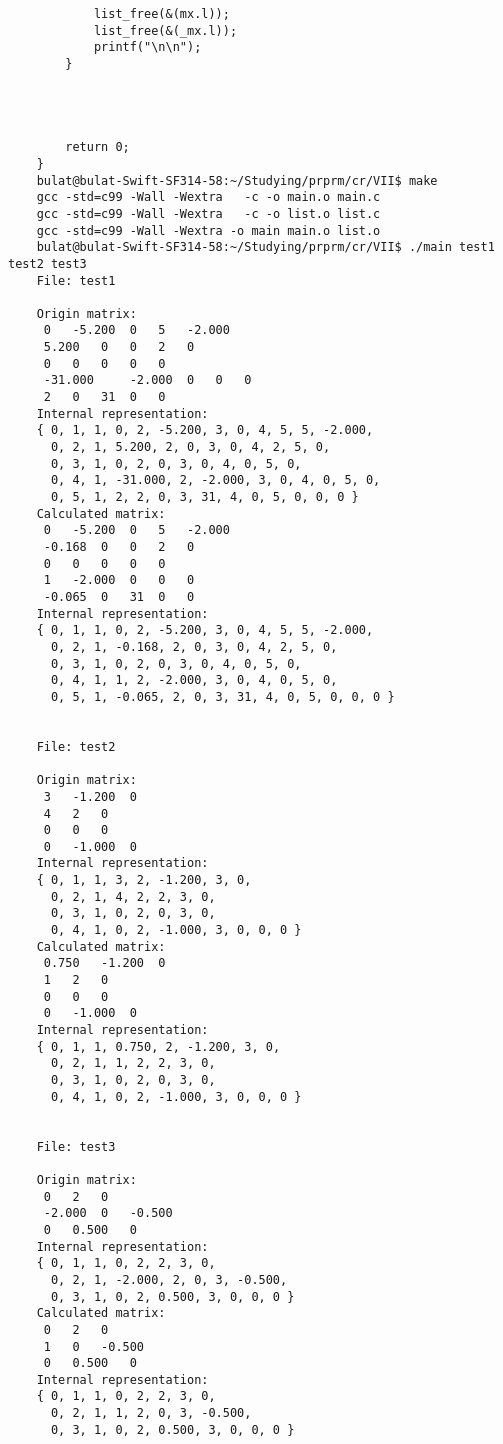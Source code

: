 \documentclass[a4paper]{article}
\newcounter{i}
\begin{document}
\begin{enumerate}[label=\textbf{\arabic*}.]
\begin{verbatim}
            list_free(&(mx.l));
            list_free(&(_mx.l));
            printf("\n\n");
        }
    
        
    
    
        return 0;
    }
    bulat@bulat-Swift-SF314-58:~/Studying/prprm/cr/VII$ make
    gcc -std=c99 -Wall -Wextra   -c -o main.o main.c
    gcc -std=c99 -Wall -Wextra   -c -o list.o list.c
    gcc -std=c99 -Wall -Wextra -o main main.o list.o
    bulat@bulat-Swift-SF314-58:~/Studying/prprm/cr/VII$ ./main test1 test2 test3
    File: test1
    
    Origin matrix:
     0   -5.200  0   5   -2.000 
     5.200   0   0   2   0  
     0   0   0   0   0  
     -31.000     -2.000  0   0   0  
     2   0   31  0   0  
    Internal representation:
    { 0, 1, 1, 0, 2, -5.200, 3, 0, 4, 5, 5, -2.000, 
      0, 2, 1, 5.200, 2, 0, 3, 0, 4, 2, 5, 0,
      0, 3, 1, 0, 2, 0, 3, 0, 4, 0, 5, 0, 
      0, 4, 1, -31.000, 2, -2.000, 3, 0, 4, 0, 5, 0, 
      0, 5, 1, 2, 2, 0, 3, 31, 4, 0, 5, 0, 0, 0 }
    Calculated matrix:
     0   -5.200  0   5   -2.000 
     -0.168  0   0   2   0  
     0   0   0   0   0  
     1   -2.000  0   0   0  
     -0.065  0   31  0   0  
    Internal representation:
    { 0, 1, 1, 0, 2, -5.200, 3, 0, 4, 5, 5, -2.000, 
      0, 2, 1, -0.168, 2, 0, 3, 0, 4, 2, 5, 0, 
      0, 3, 1, 0, 2, 0, 3, 0, 4, 0, 5, 0, 
      0, 4, 1, 1, 2, -2.000, 3, 0, 4, 0, 5, 0, 
      0, 5, 1, -0.065, 2, 0, 3, 31, 4, 0, 5, 0, 0, 0 }
    
    
    File: test2
    
    Origin matrix:
     3   -1.200  0  
     4   2   0  
     0   0   0  
     0   -1.000  0  
    Internal representation:
    { 0, 1, 1, 3, 2, -1.200, 3, 0, 
      0, 2, 1, 4, 2, 2, 3, 0, 
      0, 3, 1, 0, 2, 0, 3, 0, 
      0, 4, 1, 0, 2, -1.000, 3, 0, 0, 0 }
    Calculated matrix:
     0.750   -1.200  0  
     1   2   0  
     0   0   0  
     0   -1.000  0  
    Internal representation:
    { 0, 1, 1, 0.750, 2, -1.200, 3, 0, 
      0, 2, 1, 1, 2, 2, 3, 0, 
      0, 3, 1, 0, 2, 0, 3, 0, 
      0, 4, 1, 0, 2, -1.000, 3, 0, 0, 0 }
    
    
    File: test3
    
    Origin matrix:
     0   2   0  
     -2.000  0   -0.500 
     0   0.500   0  
    Internal representation:
    { 0, 1, 1, 0, 2, 2, 3, 0, 
      0, 2, 1, -2.000, 2, 0, 3, -0.500, 
      0, 3, 1, 0, 2, 0.500, 3, 0, 0, 0 }
    Calculated matrix:
     0   2   0  
     1   0   -0.500 
     0   0.500   0  
    Internal representation:
    { 0, 1, 1, 0, 2, 2, 3, 0, 
      0, 2, 1, 1, 2, 0, 3, -0.500, 
      0, 3, 1, 0, 2, 0.500, 3, 0, 0, 0 }
    

\end{verbatim}
\end{enumerate}
\end{document}
